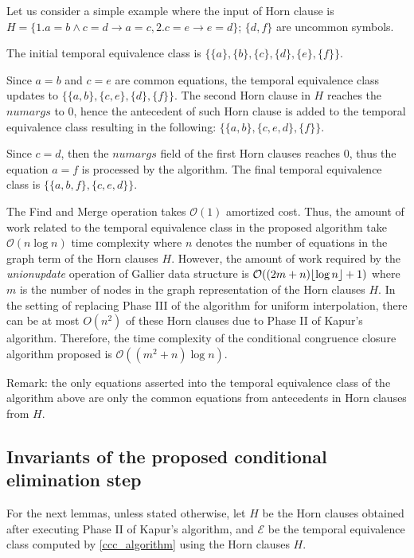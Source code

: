 \begin{example}
  Let us consider a simple example where the input 
  of Horn clause is $H = \{ 
    1. a = b \land c = d \rightarrow a = c,
    2. c = e \rightarrow e = d
  \}$; $\{d, f\}$ are uncommon symbols.

  The initial temporal equivalence class is 
  $\{\{a\}, \{b\}, \{c\}, \{d\}, \{e\}, \{f\}\}$.

  Since $a = b$ and $c = e$ are common equations, 
  the temporal equivalence class updates to 
  $\{\{a, b\}, \{c, e\}, \{d\}, \{f\}\}$.
  The second Horn clause in $H$ reaches the 
  $numargs$ to 0, hence the antecedent of such
  Horn clause is added to the temporal 
  equivalence class resulting in the following:
  $\{\{a, b\}, \{c, e, d\}, \{f\}\}$.

  Since $c = d$, then the $numargs$ field of 
  the first Horn clauses 
  reaches 0, thus the equation $a = f$ is 
  processed by the algorithm. The final 
  temporal equivalence class is
  $\{\{a, b, f\}, \{c, e, d\}\}$.
\end{example}

The Find and Merge
operation takes $\mathcal{O}(1)$ amortized cost. Thus, 
the amount of work related to the temporal 
equivalence class
in the proposed algorithm take 
$\mathcal{O}(n \log n)$ 
time complexity
where $n$ denotes the number of equations in 
the graph term 
of the Horn clauses $H$.
However, the amount of work required by the 
\emph{unionupdate}
operation of Gallier data structure is 
$\mathcal{O}((2 m + n)\lfloor \log n \rfloor + 1)$ 
where $m$ is the number of nodes 
in the graph representation of the Horn clauses $H$. 
In the setting of replacing Phase III of the 
algorithm for uniform interpolation,
there can be at most $O(n^2)$
of these Horn clauses due to Phase II of Kapur's 
algorithm.
Therefore, the time complexity of the conditional
congruence closure algorithm proposed is
$\mathcal{O}((m^2 + n)\log n)$.


Remark: the only equations asserted into the 
temporal equivalence class of the algorithm
above are only the common equations from 
antecedents in Horn clauses from $H$.

\subsection{Invariants of the proposed
conditional elimination step}

For the next lemmas, unless stated otherwise, let
$H$ be the Horn clauses obtained
after executing Phase II of Kapur's algorithm, and
$\mathcal{E}$ be the temporal equivalence class
computed by \ref{ccc_algorithm} using the Horn clauses
$H$.

